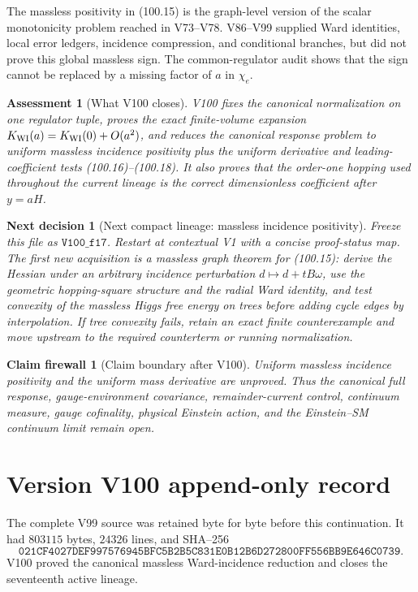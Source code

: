 \documentclass[11pt]{article}
\newtheorem{firewall}[theorem]{Claim firewall}
\newtheorem{decision}[theorem]{Next decision}
\newtheorem{assessment}[theorem]{Assessment}
\theoremstyle{remark}
\begin{document}
The massless positivity in (100.15) is the graph-level version of the
scalar monotonicity problem reached in V73--V78.  V86--V99 supplied
Ward identities, local error ledgers, incidence compression, and
conditional branches, but did not prove this global massless sign.
The common-regulator audit shows that the sign cannot be replaced by a
missing factor of \(a\) in \(\chi_e\).

\begin{assessment}[What V100 closes]
\label{ass:v17v100-status}
V100 fixes the canonical normalization on one regulator tuple, proves
the exact finite-volume expansion
\(K_{\rm WI}(a)=K_{\rm WI}(0)+O(a^2)\), and reduces the canonical
response problem to uniform massless incidence positivity plus the
uniform derivative and leading-coefficient tests (100.16)--(100.18).
It also proves that the order-one hopping used throughout the current
lineage is the correct dimensionless coefficient after \(y=aH\).
\end{assessment}

\begin{decision}[Next compact lineage: massless incidence positivity]
\label{dec:v17v100-next}
Freeze this file as \(\texttt{V100\_f17}\).  Restart at contextual V1
with a concise proof-status map.  The first new acquisition is a
massless graph theorem for (100.15): derive the Hessian under an
arbitrary incidence perturbation \(d\mapsto d+tB\omega\), use the
geometric hopping-square structure and the radial Ward identity, and
test convexity of the massless Higgs free energy on trees before adding
cycle edges by interpolation.  If tree convexity fails, retain an exact
finite counterexample and move upstream to the required counterterm or
running normalization.
\end{decision}

\begin{firewall}[Claim boundary after V100]
\label{fire:v17v100}
Uniform massless incidence positivity and the uniform mass derivative
are unproved.  Thus the canonical full response, gauge-environment
covariance, remainder-current control, continuum measure, gauge
cofinality, physical Einstein action, and the Einstein--SM continuum
limit remain open.
\end{firewall}

\section*{Version V100 append-only record}
The complete V99 source was retained byte for byte before this
continuation.  It had \(803115\) bytes, \(24326\) lines, and SHA--256
\[
 \texttt{021CF4027DEF997576945BFC5B2B5C831E0B12B6D272800FF556BB9E646C0739}.
\]
V100 proved the canonical massless Ward-incidence reduction and closes
the seventeenth active lineage.
\end{document}
